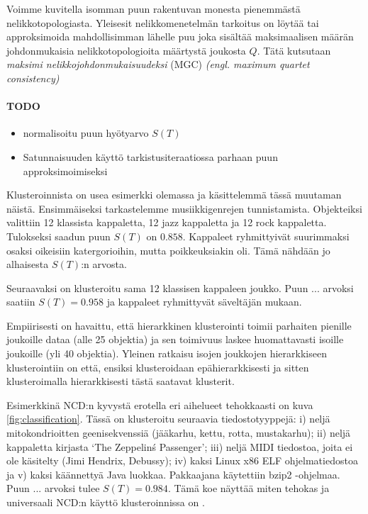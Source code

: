 \documentclass[12pt,finnish]{tktltiki2}
\theoremstyle{definition}
\theoremstyle{remark}
\newcommand{\engl}[1]{\emph{(engl. #1)}}
\begin{document}
    Voimme kuvitella isomman puun rakentuvan monesta pienemmästä nelikkotopologiasta. Yleisesit nelikkomenetelmän tarkoitus on löytää tai approksimoida mahdollisimman lähelle puu joka sisältää maksimaalisen määrän johdonmukaisia nelikkotopologioita määrtystä joukosta $Q$. Tätä kutsutaan \emph{maksimi nelikkojohdonmukaisuudeksi} (MGC) \engl{maximum quartet consistency}


  \paragraph{TODO} %
    \begin{itemize}
      \item normalisoitu puun hyötyarvo $S(T)$
      \item Satunnaisuuden käyttö tarkistusiteraatiossa parhaan puun approksimoimiseksi
    \end{itemize}


    Klusteroinnista on usea esimerkki olemassa ja käsittelemmä tässä muutaman näistä.
    Ensimmäiseksi tarkastelemme musiikkigenrejen tunnistamista.
    Objekteiksi valittiin 12 klassista kappaletta, 12 jazz kappaletta ja 12 rock kappaletta.
    Tulokseksi saadun puun $S(T)$ on $0.858$. Kappaleet ryhmittyivät suurimmaksi osaksi oikeisiin katergorioihin, mutta poikkeuksiakin oli.
    Tämä nähdään jo alhaisesta $S(T)$:n arvosta.

    Seuraavaksi on klusteroitu sama 12 klassisen kappaleen joukko. Puun ... arvoksi saatiin $S(T)=0.958$ ja kappaleet ryhmittyvät säveltäjän mukaan.

    Empiirisesti on havaittu, että hierarkkinen klusterointi toimii parhaiten pienille joukoille dataa (alle 25 objektia) ja sen toimivuus laskee huomattavasti isoille joukoille (yli 40 objektia).
    Yleinen ratkaisu isojen joukkojen hierarkkiseen klusterointiin on että, ensiksi klusteroidaan epähierarkkisesti ja sitten klusteroimalla hierarkkisesti tästä saatavat klusterit.

    Esimerkkinä NCD:n kyvystä erotella eri aihelueet tehokkaasti on kuva \ref{fig:classification}.
    Tässä on klusteroitu seuraavia tiedostotyyppejä: i) neljä mitokondrioitten geenisekvenssiä (jääkarhu, kettu, rotta, mustakarhu); ii) neljä kappaletta kirjasta `The Zeppelin\'s Passenger'; iii) neljä MIDI tiedostoa, joita ei ole käsitelty (Jimi Hendrix, Debussy); iv) kaksi Linux x86 ELF ohjelmatiedostoa ja v) kaksi käännettyä Java luokkaa.
    Pakkaajana käytettiin bzip2 -ohjelmaa.
    Puun ... arvoksi tulee $S(T)=0.984$.
    Tämä koe näyttää miten tehokas ja universaali NCD:n käyttö klusteroinnissa on \cite{CV05}.
\end{document}
